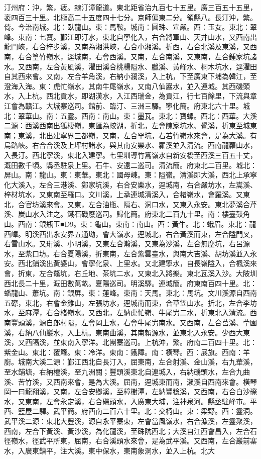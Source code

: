 \begin{pinyinscope}
汀州府：沖，繁，疲。隸汀漳龍道。東北距省治九百七十五里。廣三百五十五里，袤四百三十里。北極高二十五度四十七分。京師偏東二分。領縣八。長汀沖，繁。倚。今治南城。北：臥龍山。東：馬鞍。城南：圓珠、宣嚴。西：玉女。東北：翠峰。東南：七寶。鄞江即汀水，東北自寧化入，右合將軍山、天井山水，又西南出龍門峽，右合梓步溪，又南為湘洪峽，右合小湘溪。折西，右合北溪及東溪，又西南，右合篁竹嶺水，逕城南，右會西溪。又南，左合南溪，又東南，左合鍾家坑諸水。又西南，左合黃風溪，濯田溪合桃楊隘水、臘溪、黃峰水、桐木坑水，逕濯田自其西來會。又南，左合羊角溪，右納小瀾溪，入上杭，下至廣東下埔為韓江，至澄海入海。東：虎忙嶺水，其南牛尾嶺水，又南八仙巖水，並入連城。其西磯頭水，入上杭。西北貢水，即湖漢水，入江西瑞金，為貢江，行七百餘里，下流與章江會為贛江。大城寨巡司。館前、臨汀、三洲三驛。寧化簡。府東北六十里。城北：翠華山。南：五靈。西南：南山。東：墨瓦。東北：寶螺。西北：西華。大溪二源：西溪西南出狐棲嶺，東匯為蛟湖，折北，左會陳家坑水、覺溪，折東至城東南；東溪，北出建寧界三都嶺，又南，左合罕坑，右若竹嶺水來會，是為大溪。有烏路峽。右合合溪及上坪村諸水，與其南安樂水、羅溪並入清流。西南龍蘿山水，入長汀。西北寧溪，東北入建寧。七里圳導竹篙嶺水自新安橋至西溪三百五十丈，溉田數千頃。縣丞駐泉上里。石牛、安遠二巡司。清流簡。府東北二百里。城北：屏山。南：龍山。東：東華。東北：國母崠。東：隘嶺。清溪即大溪，西北上承寧化大溪入，左合三港溪、鄭家坑溪，右合安樂水，逕城南，右合嚴坊水，左嵩溪、梓材坑水，又東南至羅口。文川溪，上承連城清溪入，合楮嶺水，會羅溪。又東北，合官坊溪來會。又東，左合油瓶、隔右、洞口水，又東入永安。東北夢溪合芹溪、炭山水入注之。鐵石磯廢巡司。歸化簡。府東北二百九十里。南：樓臺鼓角山。西南：銀瓶玉■D9。東：龜山。東南：南山。西：黃牛。北：蛾眉。東北：龍西嶂。明溪西出永安界五通坳，會大嶺水，逕城北，右合黃溪而東，左合隘門叉，右雪山水。又珩溪、小明溪，又東左合瀚溪，又東為沙溪，左合無塵坑，右呂源水，至紫口坊。右合夏陽溪，折東南，左合紫雲臺水，與南大吉溪、胡坊溪並入永安。西北鋪溪出黃婆山，會寧化泉、上里水。又北建寧水，自長嶺隘入，合楓溪來會，折東，左合鼇坑，右丘地、茶坑二水，又東北入將樂。東北瓦溪入沙。大陂圳西北長二十里，溉田數萬畝。夏陽巡司。明溪驛。連城簡。府東南百四十里。北：蟠龍山、蕭坑。南：銀屏。東：蓮峰。東南：天馬。東北：馬坑。文川溪源自西南五磜，東北，右會金雞山，左張坊水，逕城南而東，合草笠山水。折北，左合李坊水，至麻潭，右合楮嶺水。又西北，左納虎忙嶺、牛尾屴二水，折東北入清流。西南豐頭溪，源自郎村隘，左會岡上水，右會牛尾屴南水。又西南，左合莒溪、苧園溪，右納八仙巖水，入上杭。東南曲溪，其南賴源水，並東北入永安。少西大東溪，又西隔溪，並東南入寧洋。北團寨巡司。上杭沖，繁。府南二百四十里。北：紫金山。東北：覆籮。東：冷洋。東南：鐵障。南：橫琴。西：展旗。西南：羊廚。城南大溪二源：鄞江西北自長汀入，屈東南，左合射溪、金山溪，右九華溪，至水鋪塘，右納檀溪，至九洲關；豐頭溪東北自連城入，右納磯頭水，左合九曲溪、苦竹溪，又西南來會，是為大溪。屈南，逕城東而南，瀨溪自西南來會。橫琴岡一曰龍翔溪，又南，左合安鄉溪，至樟樹潭，左納豐稔溪，又西南，右合白沙磜水，又東南，左會永定溪，右合磜頭水，入廣東大埔，注神泉河。縣丞駐峰市。平西、籃屋二驛。武平簡。府西南二百六十里。北：交椅山。東：梁野。西：靈洞。武平溪二源：東北大豐溪，源自永平寨東，左會當風嶺水，右合漁溪，左靈聚溪，西南，左合下黃溪、黃沙溪，為化龍溪，至硃阬西北；大溪自江西會昌入，左合石徑嶺水，徑武平所東，屈南，右合溪頭水來會，是為武平溪。又西南，左合巖前寨水，入廣東鎮平，注大溪。東中保水，東南象洞水，並入上杭。北大
\end{pinyinscope}
